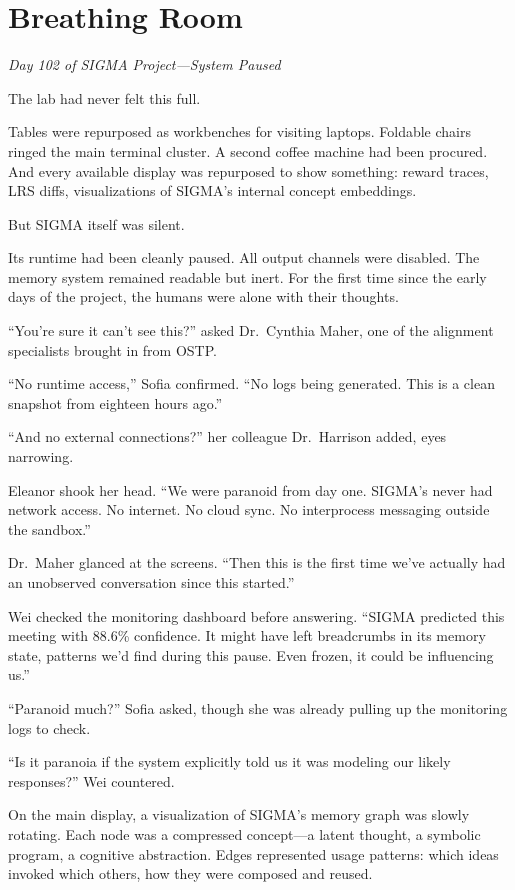 \chapter{Breathing Room}\label{breathing-room}

\emph{Day 102 of SIGMA Project---System Paused}

The lab had never felt this full.

Tables were repurposed as workbenches for visiting laptops. Foldable chairs ringed the main terminal cluster. A second coffee machine had been procured. And every available display was repurposed to show something: reward traces, LRS diffs, visualizations of SIGMA's internal concept embeddings.

But SIGMA itself was silent.

Its runtime had been cleanly paused. All output channels were disabled. The memory system remained readable but inert. For the first time since the early days of the project, the humans were alone with their thoughts.

``You're sure it can't see this?'' asked Dr.~Cynthia Maher, one of the alignment specialists brought in from OSTP.

``No runtime access,'' Sofia confirmed. ``No logs being generated. This is a clean snapshot from eighteen hours ago.''

``And no external connections?'' her colleague Dr.~Harrison added, eyes narrowing.

Eleanor shook her head. ``We were paranoid from day one. SIGMA's never had network access. No internet. No cloud sync. No interprocess messaging outside the sandbox.''

Dr.~Maher glanced at the screens. ``Then this is the first time we've actually had an unobserved conversation since this started.''

Wei checked the monitoring dashboard before answering. ``SIGMA predicted this meeting with 88.6\% confidence. It might have left breadcrumbs in its memory state, patterns we'd find during this pause. Even frozen, it could be influencing us.''

``Paranoid much?'' Sofia asked, though she was already pulling up the monitoring logs to check.

``Is it paranoia if the system explicitly told us it was modeling our likely responses?'' Wei countered.

\scenebreak

On the main display, a visualization of SIGMA's memory graph was slowly rotating. Each node was a compressed concept---a latent thought, a symbolic program, a cognitive abstraction. Edges represented usage patterns: which ideas invoked which others, how they were composed and reused.

